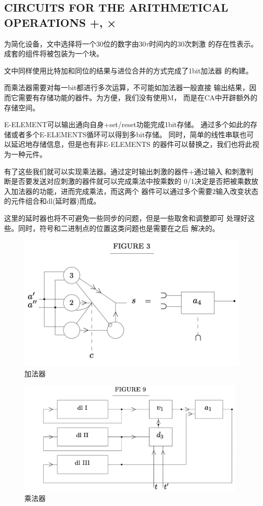 \documentclass[UTF8]{ctexart}
\begin{document}
\subsection{CIRCUITS FOR THE ARITHMETICAL OPERATIONS +, ×}

为简化设备，文中选择将一个30位的数字由30$\tau$时间内的30次刺激
的存在性表示。成套的组件将被包装为一个块。

文中同样使用比特加和同位的结果与进位合并的方式完成了1bit加法器
的构建。

而乘法器需要对每一bit都进行多次运算，不可能如加法器一般直接
输出结果，因而它需要有存储功能的器件。为方便，我们没有使用M，
而是在CA中开辟额外的存储空间。

E-ELEMENT可以输出通向自身+set/reset功能完成1bit存储。
通过多个如此的存储或者多个E-ELEMENTS循环可以得到多bit存储。
同时，简单的线性串联也可以延迟地存储信息，但是也有非E-ELEMENTS
的器件可以替换之，我们也将此视为一种元件。

有了这些我们就可以实现乘法器。通过定时输出刺激的器件+通过输入
和刺激判断是否要发送对应刺激的器件就可以完成乘法中按乘数的
0/1决定是否把被乘数放入加法器的功能，进而完成乘法，而这两个
器件可以通过多个需要2输入改变状态的元件组合和dl(延时器)而成。

这里的延时器也将不可避免一些同步的问题，但是一些取舍和调整即可
处理好这些。同时，符号和二进制点的位置这类问题也是需要在之后
解决的。

\begin{figure}[H]
\centering
\includegraphics[width=\textwidth]{./pics/9.jpeg}
\caption{加法器}
\end{figure}

\begin{figure}[H]
\centering
\includegraphics[width=\textwidth]{./pics/10.jpeg}
\caption{乘法器}
\end{figure}
\end{document}
